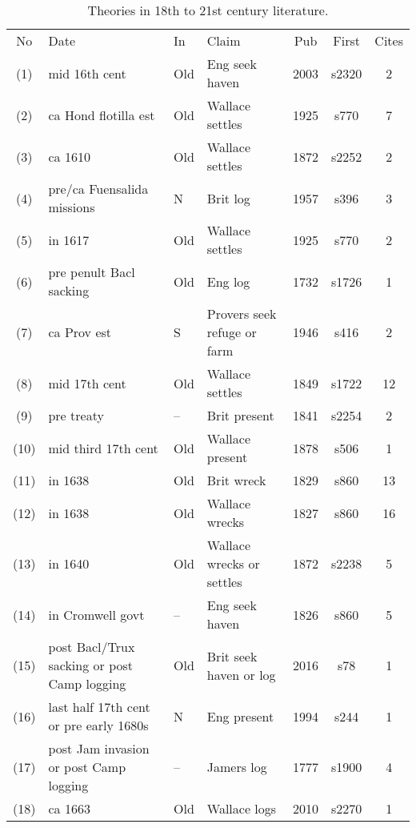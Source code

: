 \begin{table} %
\caption{Theories in 18th to 21st century literature.}
\label{tab:literature}
\begin{sideways}
\begin{tabular}{cp{.35\textheight}lp{.2\textheight}ccc}
No	&Date	&In	&Claim	&Pub&First	&Cites\\
(1)	&mid 16th cent	&Old	&Eng seek haven	&2003	&s2320	&2\\ %
(2)	&ca Hond flotilla est	&Old	&Wallace settles	&1925	&s770	&7\\ %
(3)	&ca 1610	&Old&Wallace settles	&1872	&s2252	&2\\ %
(4)	&pre/ca Fuensalida missions	&N	&Brit log	&1957	&s396	&3\\ %
(5)	&in 1617	&Old	&Wallace settles	&1925	&s770	&2\\ %
(6)	&pre penult Bacl sacking	&Old	&Eng log	&1732	&s1726	&1\\ %
(7)	&ca Prov est	&S &Provers seek refuge or farm	&1946	&s416	&2\\ %
(8)	&mid 17th cent	&Old	&Wallace settles	&1849	&s1722	&12\\ %
(9)	&pre treaty	&--	&Brit present	&1841	&s2254	&2\\ %
(10)	&mid third 17th cent	&Old	&Wallace present	&1878	&s506	&1\\ %
(11)	&in 1638	&Old	&Brit wreck	&1829	&s860	&13\\ %
(12)	&in 1638	&Old	&Wallace wrecks	&1827	&s860	&16\\ %
(13)	&in 1640	&Old	&Wallace wrecks or settles	&1872	&s2238	&5\\ %
(14)	&in Cromwell govt	&--	&Eng seek haven	&1826	&s860	&5\\ %
(15)	&post Bacl/Trux sacking or post Camp logging	&Old	&Brit seek haven or log	&2016	&s78	&1\\ %
(16)	&last half 17th cent or pre early 1680s	&N	&Eng present	&1994	&s244	&1\\ %
(17)	&post Jam invasion or post Camp logging	&--	&Jamers log	&1777	&s1900	&4\\ %
(18)	&ca 1663	&Old	&Wallace logs	&2010	&s2270	&1\\ %

\end{tabular}
\end{sideways}
\end{table}
